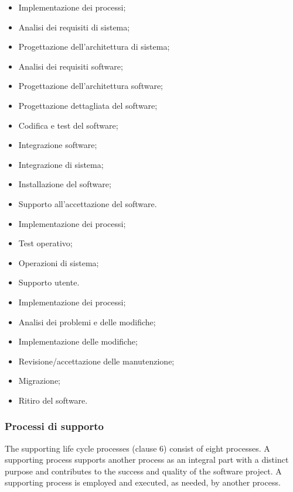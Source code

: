 \begin{itemize}
    \item Implementazione dei processi;
    \item Analisi dei requisiti di sistema;
    \item Progettazione dell'architettura di sistema;
    \item Analisi dei requisiti software;
    \item Progettazione dell'architettura software;   
    \item Progettazione dettagliata del software;
    \item Codifica e test del software;
    \item Integrazione software;
    \item Integrazione di sistema;
    \item Installazione del software;
    \item Supporto all'accettazione del software.
\end{itemize}

\begin{itemize}
    \item Implementazione dei processi;
    \item Test operativo;
    \item Operazioni di sistema;
    \item Supporto utente.
\end{itemize}

\begin{itemize}
    \item Implementazione dei processi;
    \item Analisi dei problemi e delle modifiche;
    \item Implementazione delle modifiche;
    \item Revisione/accettazione delle manutenzione;
    \item Migrazione;
    \item Ritiro del software.
\end{itemize}
\subsubsection{Processi di supporto}
The supporting life cycle processes (clause 6) consist of eight processes. A supporting process
supports another process as an integral part with a distinct purpose and contributes to the success and
quality of the software project. A supporting process is employed and executed, as needed, by another
process. 

